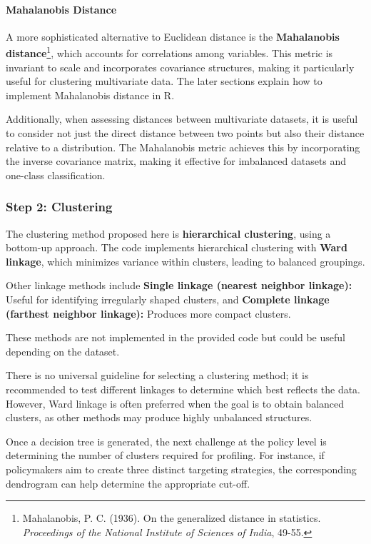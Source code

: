 \documentclass[
]{article}
\begin{document}
\paragraph{Mahalanobis Distance}\label{mahalanobis-distance}

A more sophisticated alternative to Euclidean distance is the
\textbf{Mahalanobis distance}\footnote{Mahalanobis, P. C. (1936). On the
  generalized distance in statistics. \emph{Proceedings of the National
  Institute of Sciences of India}, 49-55.}, which accounts for
correlations among variables. This metric is invariant to scale and
incorporates covariance structures, making it particularly useful for
clustering multivariate data. The later sections explain how to
implement Mahalanobis distance in R.

Additionally, when assessing distances between multivariate datasets, it
is useful to consider not just the direct distance between two points
but also their distance relative to a distribution. The Mahalanobis
metric achieves this by incorporating the inverse covariance matrix,
making it effective for imbalanced datasets and one-class
classification.

\subsubsection{Step 2: Clustering}\label{step-2-clustering}

The clustering method proposed here is \textbf{hierarchical clustering},
using a bottom-up approach. The code implements hierarchical clustering
with \textbf{Ward linkage}, which minimizes variance within clusters,
leading to balanced groupings.

Other linkage methods include \textbf{Single linkage (nearest neighbor
linkage):} Useful for identifying irregularly shaped clusters, and
\textbf{Complete linkage (farthest neighbor linkage):} Produces more
compact clusters.

These methods are not implemented in the provided code but could be
useful depending on the dataset.

There is no universal guideline for selecting a clustering method; it is
recommended to test different linkages to determine which best reflects
the data. However, Ward linkage is often preferred when the goal is to
obtain balanced clusters, as other methods may produce highly unbalanced
structures.

Once a decision tree is generated, the next challenge at the policy
level is determining the number of clusters required for profiling. For
instance, if policymakers aim to create three distinct targeting
strategies, the corresponding dendrogram can help determine the
appropriate cut-off.
\end{document}
